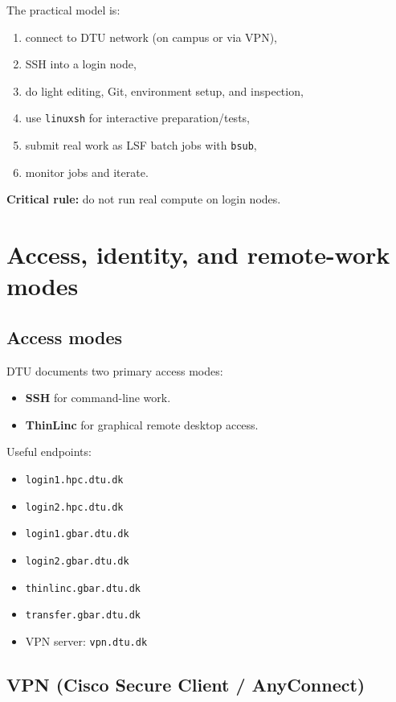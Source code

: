 \documentclass[11pt,a4paper]{article}
\begin{document}
The practical model is:

\begin{enumerate}[leftmargin=1.5em]
  \item connect to DTU network (on campus or via VPN),
  \item SSH into a login node,
  \item do light editing, Git, environment setup, and inspection,
  \item use \texttt{linuxsh} for interactive preparation/tests,
  \item submit real work as LSF batch jobs with \texttt{bsub},
  \item monitor jobs and iterate.
\end{enumerate}

\textbf{Critical rule:} do not run real compute on login nodes.

\section{Access, identity, and remote-work modes}

\subsection{Access modes}

DTU documents two primary access modes:

\begin{itemize}[leftmargin=1.5em]
  \item \textbf{SSH} for command-line work.
  \item \textbf{ThinLinc} for graphical remote desktop access.
\end{itemize}

Useful endpoints:

\begin{itemize}[leftmargin=1.5em]
  \item \texttt{login1.hpc.dtu.dk}
  \item \texttt{login2.hpc.dtu.dk}
  \item \texttt{login1.gbar.dtu.dk}
  \item \texttt{login2.gbar.dtu.dk}
  \item \texttt{thinlinc.gbar.dtu.dk}
  \item \texttt{transfer.gbar.dtu.dk}
  \item VPN server: \texttt{vpn.dtu.dk}
\end{itemize}

\subsection{VPN (Cisco Secure Client / AnyConnect)}
\end{document}
